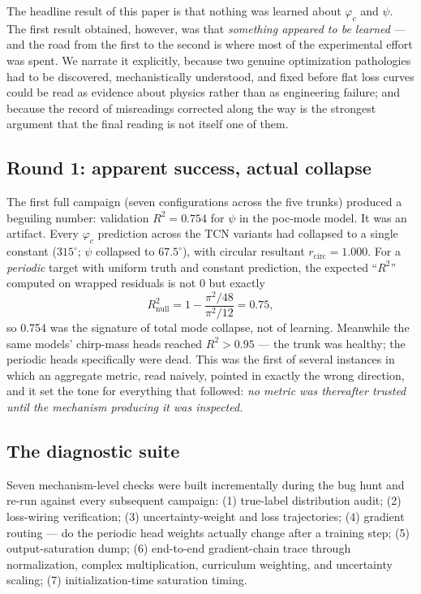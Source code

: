 \documentclass[11pt]{article}
\begin{document}
The headline result of this paper is that nothing was learned about $\varphi_c$ and $\psi$.
The first result obtained, however, was that \emph{something appeared to be learned} --- and the road from the first to the second is where most of the experimental effort was spent.
We narrate it explicitly, because two genuine optimization pathologies had to be discovered, mechanistically understood, and fixed before flat loss curves could be read as evidence about physics rather than as engineering failure; and because the record of misreadings corrected along the way is the strongest argument that the final reading is not itself one of them.

\subsection{Round 1: apparent success, actual collapse}
\label{sec:phicpsi:round1}

The first full campaign (seven configurations across the five trunks) produced a beguiling number: validation $R^2 = 0.754$ for $\psi$ in the poc-mode model.
It was an artifact.
Every $\varphi_c$ prediction across the TCN variants had collapsed to a single constant ($315^\circ$; $\psi$ collapsed to $67.5^\circ$), with circular resultant $r_{\mathrm{circ}} = 1.000$.
For a \emph{periodic} target with uniform truth and constant prediction, the expected ``$R^2$'' computed on wrapped residuals is not 0 but exactly
\begin{equation}
    R^2_{\mathrm{null}} = 1 - \frac{\pi^2/48}{\pi^2/12} = 0.75,
\end{equation}
so 0.754 was the signature of total mode collapse, not of learning.
Meanwhile the same models' chirp-mass heads reached $R^2 > 0.95$ --- the trunk was healthy; the periodic heads specifically were dead.
This was the first of several instances in which an aggregate metric, read naively, pointed in exactly the wrong direction, and it set the tone for everything that followed: \emph{no metric was thereafter trusted until the mechanism producing it was inspected.}

\subsection{The diagnostic suite}
\label{sec:phicpsi:suite}

Seven mechanism-level checks were built incrementally during the bug hunt and re-run against every subsequent campaign: (1) true-label distribution audit; (2) loss-wiring verification; (3) uncertainty-weight and loss trajectories; (4) gradient routing --- do the periodic head weights actually change after a training step; (5) output-saturation dump; (6) end-to-end gradient-chain trace through normalization, complex multiplication, curriculum weighting, and uncertainty scaling; (7) initialization-time saturation timing.
\end{document}
